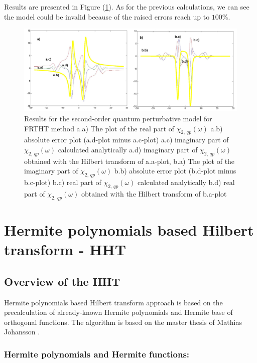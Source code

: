 \documentclass[12pt,twoside,a4paper]{article}
\numberwithin{equation}{subsection}
\numberwithin{figure}{subsection}
\begin{document}
Results are presented in Figure (\ref{fig:fht_qp2}). As for the previous calculations, we can see the model could be invalid because of the raised errors reach up to $ 100 \% $.

\begin{figure} 
  \includegraphics[width=150mm]{img/fht_qp2.png}
  \caption{Results for the second-order quantum perturbative model for FRTHT method
     a.a) The plot of the real part of $\chi_{2, \, qp}(\omega )$
     a.b) absolute error plot (a.d-plot minus a.c-plot) 
     a.c) imaginary part of $\chi_{2, \, qp}(\omega )$ calculated analytically 
     a.d) imaginary part of $\chi_{2, \, qp}(\omega )$ obtained with the Hilbert transform of a.a-plot, 
     b.a) The plot of the imaginary part of $\chi_{2, \, qp}(\omega )$ 
     b.b) absolute error plot (b.d-plot minus b.c-plot) 
     b.c) real part of $\chi_{2, \, qp} (\omega )$ calculated analytically 
     b.d) real part of $\chi_{2, \, qp} (\omega )$ obtained with the Hilbert transform of b.a-plot 
     \label{fig:fht_qp2}
     }
\end{figure}

\section{Hermite polynomials based Hilbert transform - HHT} \label{chap:hermite}

\subsection{Overview of the HHT}  \label{chap:hermite_overview}

Hermite polynomials based Hilbert transform approach is based on the precalculation of already-known Hermite polynomials and Hermite base of orthogonal functions. The algorithm is based on the master thesis of Mathias Johansson \cite{johansson_hilbert}.

\subsubsection*{Hermite polynomials and Hermite functions:}
\end{document}
